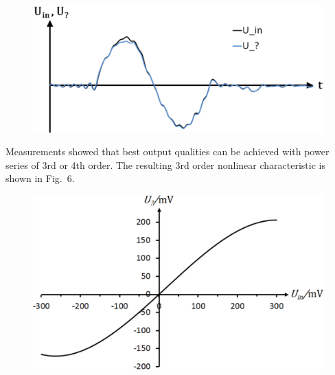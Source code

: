 \documentclass[a4paper,
              ]{jacow}
\begin{document}
	\begin{figure}[!h]
	\vspace*{-.5\baselineskip}
	 \begin{center}
	  \includegraphics[scale=0.3]{WEPVA047f5.eps}
	 \label{Vergleich1}
	 \end{center}
	\vspace*{-\baselineskip}	 
	\end{figure}
	
	Measurements showed that best output qualities can be achieved with power series of 3rd or 4th order. The resulting 3rd order nonlinear characteristic 
	is shown in Fig.~6.
	\begin{figure}
	\vspace*{-.5\baselineskip}
	 \begin{center}
	  \includegraphics[scale=0.3]{WEPVA047f6.eps}
	 \label{Kennlinie}
	 \end{center}
	 \vspace*{-\baselineskip}
	\end{figure}
\end{document}

